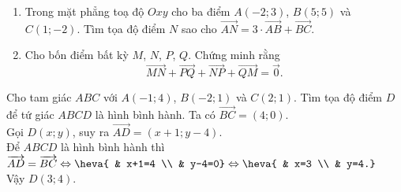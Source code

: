 \begin{bt}%
\begin{enumerate}
\item Trong mặt phẳng toạ độ $O x y$ cho ba điểm $A(-2 ; 3)$, $B(5 ; 5)$ và $C(1 ;-2)$. Tìm tọa độ điểm $N$ sao cho $\overrightarrow{AN}=3 \cdot \overrightarrow{AB}+\overrightarrow{BC}$.
\item Cho bốn điểm bất kỳ $M$, $N$, $P$, $Q$. Chứng minh rằng
\[\overrightarrow{MN}+\overrightarrow{PQ}+\overrightarrow{NP}+\overrightarrow{QM}=\overrightarrow{0}.\]
\end{enumerate}
\end{bt}

\begin{bt}%
Cho tam giác $ABC$ với $A(-1;4)$, $B(-2;1)$ và $C(2;1)$. Tìm tọa độ điểm $D$ để tứ giác $ABCD$ là hình bình hành.
\loigiai
{
Ta có $\overrightarrow{BC}=(4;0)$. \\
Gọi $D(x;y)$, suy ra $\overrightarrow{AD}=(x+1;y-4)$. \\
Để $ABCD$ là hình bình hành thì $\overrightarrow{AD}=\overrightarrow{BC} \Leftrightarrow \heva{ & x+1=4 \\ & y-4=0} \Leftrightarrow \heva{ & x=3 \\ & y=4.}$ \\
Vậy $D(3;4)$.
}
\end{bt}

